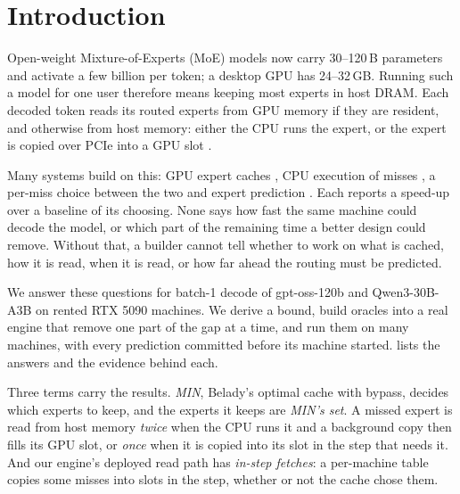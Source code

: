 \section{Introduction}
Open-weight Mixture-of-Experts (MoE) models now carry 30--120\,B parameters and activate a few billion per token; a
desktop GPU has 24--32\,GB. Running such a model for one user therefore means keeping most experts in host DRAM. Each
decoded token reads its routed experts from GPU memory if they are resident, and otherwise from host memory: either the
CPU runs the expert, or the expert is copied over PCIe into a GPU slot \citep{ivanov2021datamovement,hoefler2021sparsity}.

Many systems build on this: GPU expert caches \citep{eliseev2023offloading,xue2024moeinfinity,song2024promoe}, CPU
execution of misses \citep{kamahori2024fiddler,ktransformers,zhong2025hybrimoe}, a per-miss choice between the
two \citep{freetoken,dali2026} and expert prediction \citep{hwang2024pregated,zhu2025preattention,wang2026seqmoe}. Each
reports a speed-up over a baseline of its choosing. None says how fast the same machine could decode the model, or which
part of the remaining time a better design could remove. Without that, a builder cannot tell whether to work on what is
cached, how it is read, when it is read, or how far ahead the routing must be predicted.

We answer these questions for batch-1 decode of gpt-oss-120b \citep{openai2025gptoss} and Qwen3-30B-A3B
\citep{yang2025qwen3} on rented RTX 5090 machines. We derive a bound, build oracles into a real engine that remove one
part of the gap at a time, and run them on many machines, with every prediction committed before its machine started.
 lists the answers and the evidence behind each.

Three terms carry the results. \emph{MIN}, Belady's optimal cache with bypass, decides which experts to keep, and the
experts it keeps are \emph{MIN's set}. A missed expert is read from host memory \emph{twice} when the CPU runs it and a
background copy then fills its GPU slot, or \emph{once} when it is copied into its slot in the step that needs it. And
our engine's deployed read path has \emph{in-step fetches}: a per-machine table copies some misses into slots in the
step, whether or not the cache chose them.

